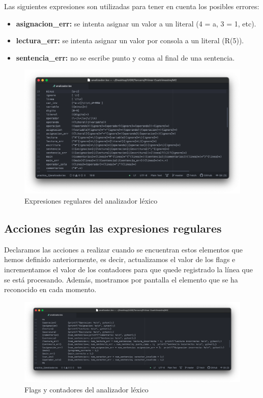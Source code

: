 Las siguientes expresiones son utilizadas para tener en cuenta los posibles errores:
\begin{itemize}
	\item \textbf{asignacion\_err:} se intenta asignar un valor a un literal (4 = a, 3 = 1, etc).
	\item \textbf{lectura\_err:} se intenta asignar un valor por consola a un literal (R(5)).
	\item \textbf{sentencia\_err:} no se escribe punto y coma al final de una sentencia.
\end{itemize}

\begin{figure}[H] 
	\centering
	\includegraphics[scale=0.425]{../practica_2/images/expresiones_regulares.png} 
	\caption{Expresiones regulares del analizador léxico} 
    \label{fig:expresiones_regulares}
\end{figure}

\subsection{Acciones según las expresiones regulares}

Declaramos las acciones a realizar cuando se encuentran estos elementos que hemos definido anteriormente, es decir, actualizamos el valor de los flags e incrementamos el valor de los contadores para que
quede registrado la línea que se está procesando. Además, mostramos por pantalla el elemento que se ha reconocido en cada momento.

\begin{figure}[H] 
	\centering
	\includegraphics[scale=0.35]{../practica_2/images/acciones.png} 
	\caption{Flags y contadores del analizador léxico} 
    \label{fig:acciones}
\end{figure}


